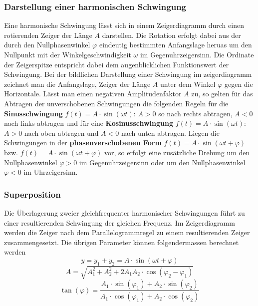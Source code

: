 \subsubsection{Darstellung einer harmonischen Schwingung}
Eine harmonische Schwingung lässt sich in einem Zeigerdiagramm durch einen rotierenden Zeiger der Länge $A$ darstellen. Die Rotation erfolgt dabei aus der durch den Nullphasenwinkel $\varphi$ eindeutig bestimmten Anfangslage heruas um den Nullpunkt mit der Winkelgeschwindigkeit $\omega$ im Gegenuhrzeigersinn. Die Ordinate der Zeigerspitze entspricht dabei dem augenblicklichen Funktionswert der Schwingung.
\newline\newline
Bei der bildlichen Darstellung einer Schwingung im zeigerdiagramm zeichnet man die Anfangslage, Zeiger der Länge $A$ unter dem Winkel $\varphi$ gegen die Horizontale. Lässt man einen negativen Amplitudenfaktor $A$ zu, so gelten für das Abtragen der unverschobenen Schwingungen die folgenden Regeln für die \textbf{Sinusschwingung} $f\left(t\right)=A\cdot \sin\left(\omega t\right)$: $A>0$ so nach rechts abtragen, $A<0$ nach links abtragen und für eine \textbf{Kosinusschwingung} $f\left(t\right)=A\cdot \sin\left(\omega t\right)$: $A>0$ nach oben abtragen und $A<0$ nach unten abtragen. 
\newline\newline
Liegen die Schwingungen in der \textbf{phasenverschobenen Form} $f\left(t\right)=A\cdot \sin\left(\omega t+\varphi\right)$ bzw. $f\left(t\right)=A\cdot \sin\left(\omega t+\varphi\right)$ vor, so erfolgt eine zusätzliche Drehung um den Nullphasenwinkel $\varphi>0$ im Gegenuhrzeigersinn oder um den Nullphasenwinkel $\varphi<0$ im Uhrzeigersinn.
\subsubsection{Superposition}
Die Überlagerung zweier gleichfrequenter harmonischer Schwingungen führt zu einer resultierenden Schwingung der gleichen Frequenz. Im Zeigerdiagramm werden die Zeiger nach dem Parallelogrammregel zu einem resultierenden Zeiger zusammengesetzt. Die übrigen Parameter können folgendermassen berechnet werden
\begin{equation}
\boxed{y=y_1+y_2=A\cdot \sin\left(\omega t + \varphi\right)}
\end{equation}
\begin{equation}
\boxed{A=\sqrt{A_1^2+A_2^2+2A_1A_2\cdot \cos\left(\varphi_2-\varphi_1\right)}}
\end{equation}
\begin{equation}
\boxed{\tan\left(\varphi\right)=\dfrac{A_1\cdot \sin\left(\varphi_1\right)+A_2\cdot \sin\left(\varphi_2\right)}{A_1\cdot \cos\left(\varphi_1\right)+A_2\cdot \cos\left(\varphi_2\right)}}
\end{equation}
